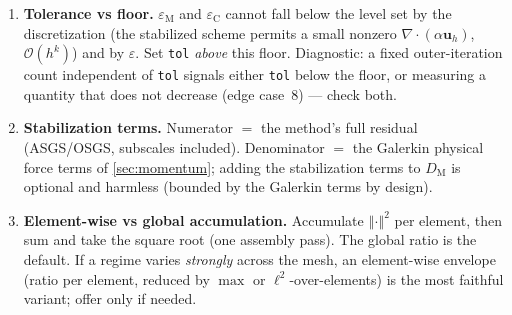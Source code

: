 \documentclass[11pt]{article}
\newcommand{\bu}{\boldsymbol{u}}
\newcommand{\divg}{\nabla\!\cdot\!}
\newcommand{\norm}[1]{\left\Vert #1\right\Vert}
\newcommand{\bigOh}{\mathcal{O}}
\newcommand{\DM}{D_{\mathrm M}}
\newcommand{\epsM}{\varepsilon_{\mathrm M}}
\newcommand{\epsC}{\varepsilon_{\mathrm C}}
\theoremstyle{plain}
\theoremstyle{remark}
\begin{document}
\begin{enumerate}
{    residual} evaluated at $U^k$ (re-assemble the operator), never the linearized
    / inner linear-solve residual --- the latter $\to0$ \emph{inside} each step
    and does not reflect outer convergence. (Gating on the inner residual makes
    the outer loop stop too early or behave erratically.)
  \item \textbf{Tolerance vs floor.} $\epsM$ and $\epsC$ cannot fall below the
    level set by the discretization (the stabilized scheme permits a small nonzero
    $\divg(\alpha\bu_h)$, $\bigOh(h^k)$) and by $\varepsilon$. Set \texttt{tol}
    \emph{above} this floor. Diagnostic: a fixed outer-iteration count independent
    of \texttt{tol} signals either \texttt{tol} below the floor, or measuring a
    quantity that does not decrease (edge case~8) --- check both.
  \item \textbf{Stabilization terms.} Numerator $=$ the method's full residual
    (ASGS/OSGS, subscales included). Denominator $=$ the Galerkin physical force
    terms of \cref{sec:momentum}; adding the stabilization terms to $\DM$ is
    optional and harmless (bounded by the Galerkin terms by design).
  \item \textbf{Element-wise vs global accumulation.} Accumulate $\norm{\cdot}^2$
    per element, then sum and take the square root (one assembly pass). The global
    ratio is the default. If a regime varies \emph{strongly} across the mesh, an
    element-wise envelope (ratio per element, reduced by $\max$ or
    $\ell^2$-over-elements) is the most faithful variant; offer only if needed.
\end{enumerate}

\end{document}
